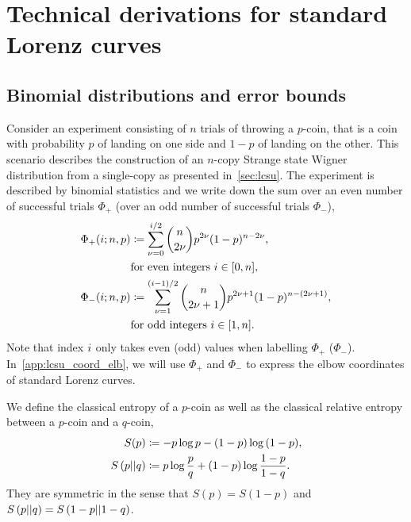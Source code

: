 \section{Technical derivations for standard Lorenz curves}
\label{app:lcsu_technical}

\subsection{Binomial distributions and error bounds}\label{app:phi}
Consider an experiment consisting of $n$ trials of throwing a $p$-coin, that is a coin with probability $p$ of landing on one side and $1-p$ of landing on the other.
This scenario describes the construction of an $n$-copy Strange state Wigner distribution from a single-copy as presented in~\cref{sec:lcsu}.
The experiment is described by binomial statistics and we write down the sum over an even number of successful trials $\Phi_+$ (over an odd number of successful trials $\Phi_-$),
\begin{align}	
	\Phi_+(i; n, p) &\coloneqq \sum\limits_{\nu=0}^{i/2} \binom{n}{2\nu} p^{2\nu} (1-p)^{n-2\nu}, \nonumber\\ 
	&\text{for even integers } i\in[0,n], \label{eq:fp_app} \\
	\Phi_-(i; n, p) &\coloneqq \sum\limits_{\nu=1}^{(i-1)/2} \binom{n}{2\nu+1} p^{2\nu+1} (1-p)^{n-(2\nu+1)}, \nonumber\\ 
	&\text{for odd integers } i\in[1,n]. \label{eq:fn_app}
\end{align}
Note that index $i$ only takes even (odd) values when labelling $\Phi_+$ ($\Phi_-$).
In~\cref{app:lcsu_coord_elb}, we will use $\Phi_+$ and $\Phi_-$ to express the elbow coordinates of standard Lorenz curves.

We define the classical entropy of a $p$-coin as well as the classical relative entropy between a $p$-coin and a $q$-coin,
\begin{align}
	S(p) &\coloneqq -p\log{p} -(1-p)\log{(1-p)}, \label{eq:ent}\\
	S\left( p \middle\vert\middle\vert q \right) &\coloneqq p \log{\frac{p}{q}} + (1-p) \log{\frac{1-p}{1-q}}. \label{eq:ent_rel}
\end{align}
They are symmetric in the sense that $S(p) = S(1-p)$ and $S\left( p \middle\vert\middle\vert q \right) = S\left( 1-p \middle\vert\middle\vert 1-q \right)$.

